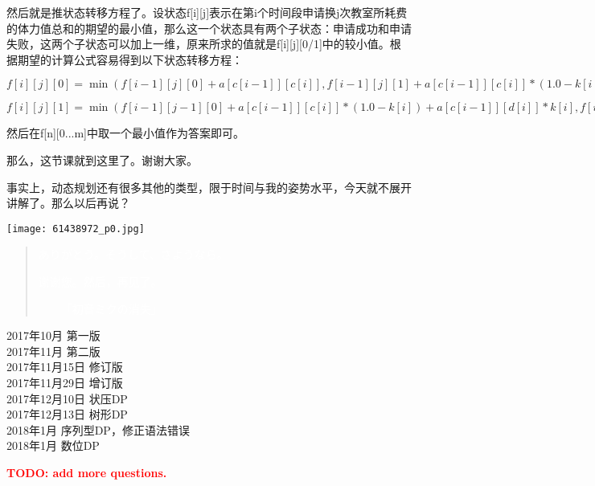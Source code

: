 	然后就是推状态转移方程了。设状态f[i][j]表示在第i个时间段申请换j次教室所耗费的体力值总和的期望的最小值，那么这一个状态具有两个子状态：申请成功和申请失败，这两个子状态可以加上一维，原来所求的值就是f[i][j][0/1]中的较小值。根据期望的计算公式容易得到以下状态转移方程：

$f[i][j][0]=\min(f[i-1][j][0]+a[c[i-1]][c[i]],f[i-1][j][1]+a[c[i-1]][c[i]]*(1.0-k[i-1])+a[d[i-1]][c[i]]*k[i-1]); $

$f[i][j][1]=\min(f[i-1][j-1][0]+a[c[i-1]][c[i]]*(1.0-k[i])+a[c[i-1]][d[i]]*k[i],f[i-1][j-1][1]+a[c[i-1]][c[i]]*(1.0-k[i])*(1.0-k[i-1])+a[d[i-1]][c[i]]*k[i-1]*(1.0-k[i])+a[c[i-1]][d[i]]*(1.0-k[i-1])*(k[i])+a[d[i-1]][d[i]]*k[i-1]*k[i]);$

然后在f[n][0...m]中取一个最小值作为答案即可。

那么，这节课就到这里了。谢谢大家。

事实上，动态规划还有很多其他的类型，限于时间与我的姿势水平，今天就不展开讲解了。那么以后再说？

\note

\begin{center}\texttt{[image: 61438972\_p0.jpg]}\end{center}
\begin{quote}
	\textcolor{white}{ありがとう。そうして、さようなら。}

	\textcolor{white}{谢谢您。然后，再见了。}
	\begin{flushright}\textcolor{white}{------「初音ミクの消失」}\end{flushright}
\end{quote}
\begin{flushright}
	2017年10月 第一版\\
	2017年11月 第二版\\
	2017年11月15日 修订版\\
	2017年11月29日 增订版\\
	2017年12月10日 状压DP\\
	2017年12月13日 树形DP\\
	2018年1月 序列型DP，修正语法错误\\
	2018年1月 数位DP\\
\end{flushright}
\begin{center}\textcolor{red}{\huge{\textbf{TODO: add more questions.}}}\end{center}
